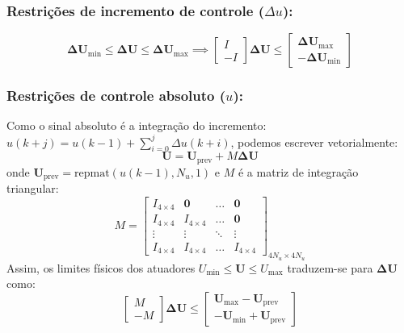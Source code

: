 \documentclass[12pt,journal,onecolumn]{article}
\begin{document}
\subsubsection{Restrições de incremento de controle ($\Delta u$):}
\begin{equation}
\bm{\Delta U}_{\text{min}} \le \bm{\Delta U} \le \bm{\Delta U}_{\text{max}} \implies 
\begin{bmatrix} I \\ -I \end{bmatrix} \bm{\Delta U} \le \begin{bmatrix} \bm{\Delta U}_{\text{max}} \\ -\bm{\Delta U}_{\text{min}} \end{bmatrix}
\end{equation}

\subsubsection{Restrições de controle absoluto ($u$):}
Como o sinal absoluto é a integração do incremento: $u(k+j) = u(k-1) + \sum_{i=0}^j \Delta u(k+i)$, podemos escrever vetorialmente:
\begin{equation}
\bm{U} = \bm{U}_{\text{prev}} + M \bm{\Delta U}
\end{equation}
onde $\bm{U}_{\text{prev}} = \text{repmat}(u(k-1), N_u, 1)$ e $M$ é a matriz de integração triangular:
\begin{equation}
M = \begin{bmatrix} 
I_{4 \times 4} & \bm{0} & \dots & \bm{0} \\
I_{4 \times 4} & I_{4 \times 4} & \dots & \bm{0} \\
\vdots & \vdots & \ddots & \vdots \\
I_{4 \times 4} & I_{4 \times 4} & \dots & I_{4 \times 4}
\end{bmatrix}_{4N_u \times 4N_u}
\end{equation}
Assim, os limites físicos dos atuadores $U_{\text{min}} \le \bm{U} \le U_{\text{max}}$ traduzem-se para $\bm{\Delta U}$ como:
\begin{equation}
\begin{bmatrix} M \\ -M \end{bmatrix} \bm{\Delta U} \le \begin{bmatrix} \bm{U}_{\text{max}} - \bm{U}_{\text{prev}} \\ -\bm{U}_{\text{min}} + \bm{U}_{\text{prev}} \end{bmatrix}
\end{equation}
\end{document}
